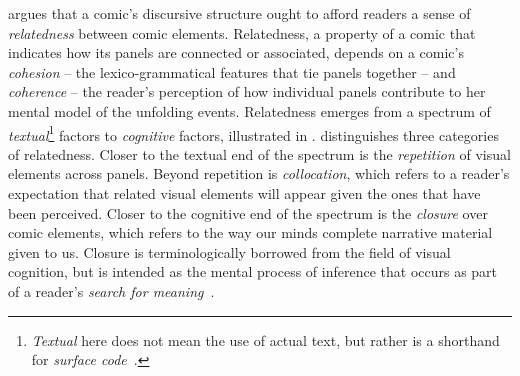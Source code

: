 \citeauthor{saraceni2016relatedness} argues that a comic's discursive structure
ought to afford readers a sense of \emph{relatedness} between comic elements.
Relatedness, a property of a comic that indicates how its panels are
connected or associated, depends on a comic's \emph{cohesion} -- the
lexico-grammatical features that tie panels together -- and \emph{coherence} --
the reader's perception of how individual panels contribute to her mental model
of the unfolding events. Relatedness emerges from a spectrum of \emph{textual}\footnote{\emph{Textual} here does not mean the use of actual text, but rather is a shorthand for \emph{surface code}~\cite{zwaan1998situation}.}
factors to \emph{cognitive} factors, illustrated in .
%
%
\citeauthor{saraceni2016relatedness} distinguishes three categories of relatedness.
Closer to the textual end of the spectrum is the \emph{repetition} of visual
elements across panels. Beyond repetition is \emph{collocation}, which refers
to a reader's expectation that related visual elements will appear given the
ones that have been perceived. Closer to the cognitive end of the spectrum is
the \emph{closure} over comic elements, which refers to the way our minds 
complete narrative material given to us. Closure is terminologically borrowed 
from the field of visual cognition, but is intended as the mental process 
of inference that occurs as part of a reader's 
\emph{search for meaning}~\cite{gerrig1994readers}.


